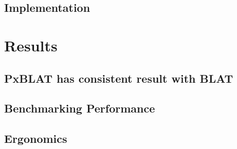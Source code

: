 \subsection*{Implementation}\label{ssec:implementation}

%



\section*{Results}\label{sec:results}

\subsection*{PxBLAT has consistent result with BLAT}\label{ssec:pxblat-has-consistent-result-with-blat}


\subsection*{Benchmarking Performance}\label{ssec:benchmarking-performance}



\subsection*{Ergonomics}\label{ssec:ergonomics}


%

%



